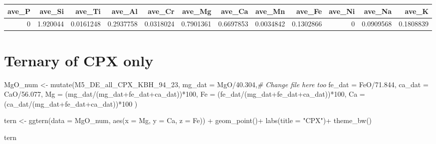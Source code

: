 \documentclass[
]{article}
\newenvironment{Shaded}{\begin{snugshade}}{\end{snugshade}}
\newcommand{\AttributeTok}[1]{\textcolor[rgb]{0.77,0.63,0.00}{#1}}
\newcommand{\CommentTok}[1]{\textcolor[rgb]{0.56,0.35,0.01}{\textit{#1}}}
\newcommand{\DecValTok}[1]{\textcolor[rgb]{0.00,0.00,0.81}{#1}}
\newcommand{\FloatTok}[1]{\textcolor[rgb]{0.00,0.00,0.81}{#1}}
\newcommand{\FunctionTok}[1]{\textcolor[rgb]{0.00,0.00,0.00}{#1}}
\newcommand{\NormalTok}[1]{#1}
\newcommand{\OtherTok}[1]{\textcolor[rgb]{0.56,0.35,0.01}{#1}}
\newcommand{\SpecialCharTok}[1]{\textcolor[rgb]{0.00,0.00,0.00}{#1}}
\newcommand{\StringTok}[1]{\textcolor[rgb]{0.31,0.60,0.02}{#1}}
\begin{document}
\begin{tabular}{r|r|r|r|r|r|r|r|r|r|r|r}
\hline
ave\_P & ave\_Si & ave\_Ti & ave\_Al & ave\_Cr & ave\_Mg & ave\_Ca & ave\_Mn & ave\_Fe & ave\_Ni & ave\_Na & ave\_K\\
\hline
0 & 1.920044 & 0.0161248 & 0.2937758 & 0.0318024 & 0.7901361 & 0.6697853 & 0.0034842 & 0.1302866 & 0 & 0.0909568 & 0.1808839\\
\hline
\end{tabular}

\hypertarget{ternary-of-cpx-only}{%
\section{Ternary of CPX only}\label{ternary-of-cpx-only}}

\begin{Shaded}
\begin{Highlighting}[]
\NormalTok{MgO\_num }\OtherTok{\textless{}{-}} \FunctionTok{mutate}\NormalTok{(M5\_DE\_all\_CPX\_KBH\_94\_23, }\AttributeTok{mg\_dat =}\NormalTok{ MgO}\SpecialCharTok{/}\FloatTok{40.304}\NormalTok{,}\CommentTok{\# Change file here too}
                  \AttributeTok{fe\_dat =}\NormalTok{ FeO}\SpecialCharTok{/}\FloatTok{71.844}\NormalTok{,}
                  \AttributeTok{ca\_dat =}\NormalTok{ CaO}\SpecialCharTok{/}\FloatTok{56.077}\NormalTok{,}
                  \AttributeTok{Mg =}\NormalTok{ (mg\_dat}\SpecialCharTok{/}\NormalTok{(mg\_dat}\SpecialCharTok{+}\NormalTok{fe\_dat}\SpecialCharTok{+}\NormalTok{ca\_dat))}\SpecialCharTok{*}\DecValTok{100}\NormalTok{,}
                  \AttributeTok{Fe =}\NormalTok{ (fe\_dat}\SpecialCharTok{/}\NormalTok{(mg\_dat}\SpecialCharTok{+}\NormalTok{fe\_dat}\SpecialCharTok{+}\NormalTok{ca\_dat))}\SpecialCharTok{*}\DecValTok{100}\NormalTok{,}
                  \AttributeTok{Ca =}\NormalTok{ (ca\_dat}\SpecialCharTok{/}\NormalTok{(mg\_dat}\SpecialCharTok{+}\NormalTok{fe\_dat}\SpecialCharTok{+}\NormalTok{ca\_dat))}\SpecialCharTok{*}\DecValTok{100}
\NormalTok{                  ) }

\NormalTok{  tern }\OtherTok{\textless{}{-}} \FunctionTok{ggtern}\NormalTok{(}\AttributeTok{data =}\NormalTok{ MgO\_num, }\FunctionTok{aes}\NormalTok{(}\AttributeTok{x =}\NormalTok{ Mg,}
                          \AttributeTok{y =}\NormalTok{ Ca, }
                          \AttributeTok{z =}\NormalTok{ Fe)) }\SpecialCharTok{+}
  \FunctionTok{geom\_point}\NormalTok{()}\SpecialCharTok{+}
    \FunctionTok{labs}\NormalTok{(}\AttributeTok{title =} \StringTok{"CPX"}\NormalTok{)}\SpecialCharTok{+}
    \FunctionTok{theme\_bw}\NormalTok{()}
  
\NormalTok{  tern}
\end{Highlighting}
\end{Shaded}
\end{document}

